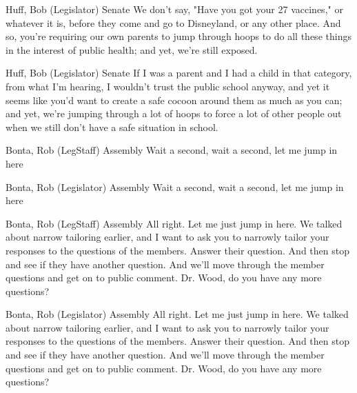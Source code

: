 \begin{result}{20.040584586913265}{Huff, Bob (Legislator) Senate}
We don't say, "Have you got your 27 vaccines," or whatever it is, before they come and go to Disneyland, or any other place. And so, you're requiring our own parents to jump through hoops to do all these things in the interest of public health; and yet, we're still exposed.
\end{result}

\begin{result}{15.249840257951574}{Huff, Bob (Legislator) Senate}
If I was a parent and I had a child in that category, from what I'm hearing, I wouldn't trust the public school anyway, and yet it seems like you'd want to create a safe cocoon around them as much as you can; and yet, we're jumping through a lot of hoops to force a lot of other people out when we still don't have a safe situation in school.
\end{result}

\begin{result}{7.7821422973482175}{Bonta, Rob (LegStaff) Assembly}
Wait a second, wait a second, let me jump in here
\end{result}

\begin{result}{7.7821422973482175}{Bonta, Rob (Legislator) Assembly}
Wait a second, wait a second, let me jump in here
\end{result}

\begin{result}{7.660613415956397}{Bonta, Rob (LegStaff) Assembly}
All right. Let me just jump in here. We talked about narrow tailoring earlier, and I want to ask you to narrowly tailor your responses to the questions of the members. Answer their question. And then stop and see if they have another question. And we'll move through the member questions and get on to public comment. Dr. Wood, do you have any more questions?
\end{result}

\begin{result}{7.660613415956397}{Bonta, Rob (Legislator) Assembly}
All right. Let me just jump in here. We talked about narrow tailoring earlier, and I want to ask you to narrowly tailor your responses to the questions of the members. Answer their question. And then stop and see if they have another question. And we'll move through the member questions and get on to public comment. Dr. Wood, do you have any more questions?
\end{result}

